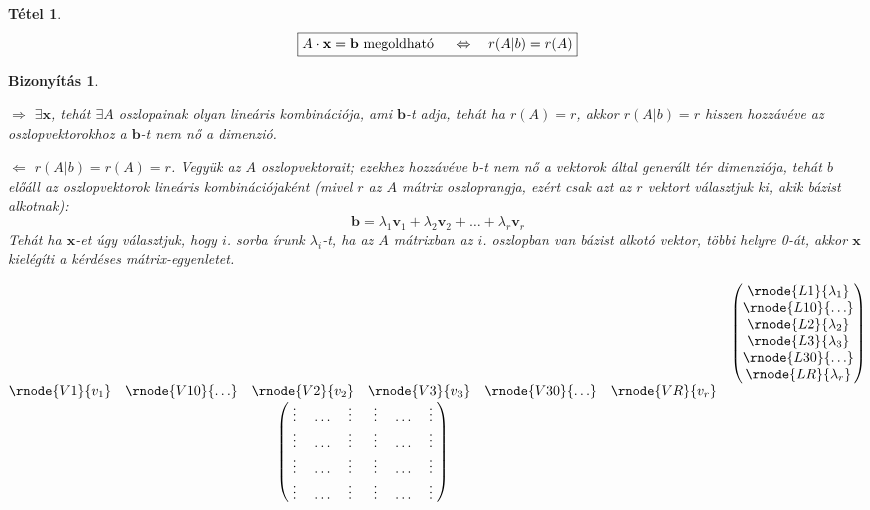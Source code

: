 \documentclass[a4paper,12pt,twoside]{book}
\newcommand{\vek}[1]{\mathbf{#1}} %
\newcommand{\linkomb}[3]{#2_1\vek{#1}_{1} + #2_2\vek{#1}_{2} + \ldots + #2_{#3}\vek{#1}_{#3}}
\newtheorem{tetel}{Tétel}[chapter]
\theoremstyle{break}
\newtheorem{bizNL}[biz]{Bizonyítás}
\begin{document}
\begin{tetel}
 \[\boxed{A\cdot \vek{x} = \vek{b} \hbox{ megoldható } \quad \Leftrightarrow \quad r(A|b) = r(A)}\]
\end{tetel}
\begin{bizNL}
 \begin{description*}
 \item[$\Rightarrow$] $\exists \vek{x}$, tehát $\exists A$ oszlopainak olyan lineáris kombinációja, ami $\vek{b}$-t adja, tehát ha $r(A) = r$, akkor $r(A|b) = r$ hiszen hozzávéve az oszlopvektorokhoz a $\vek{b}$-t nem nő a dimenzió.
 \item[$\Leftarrow$] $r(A|b) = r(A) = r$. Vegyük az $A$ oszlopvektorait; ezekhez hozzávéve $b$-t nem nő a vektorok által generált tér dimenziója, tehát $b$ előáll az oszlopvektorok lineáris kombinációjaként (mivel $r$ az $A$ mátrix oszloprangja, ezért csak azt az $r$ vektort választjuk ki, akik bázist alkotnak):
 \[\vek{b} = \linkomb{v}{\lambda}{r}\]
 Tehát ha $\vek{x}$-et úgy választjuk, hogy $i$. sorba írunk $\lambda_i$-t, ha az $A$ mátrixban az $i$. oszlopban van bázist alkotó vektor, többi helyre 0-át, akkor $\vek{x}$ kielégíti a kérdéses mátrix-egyenletet.
 \end{description*}
 \[\begin{matrix}
   & \begin{pmatrix}
      \rnode{L1}{\lambda_1} \\
      \rnode{L10}{\ldots} \\
      \rnode{L2}{\lambda_2} \\
      \rnode{L3}{\lambda_3} \\
      \rnode{L30}{\ldots} \\
      \rnode{LR}{\lambda_r}
     \end{pmatrix}\\
   \begin{matrix}
    \rnode{V1}{v_1} & \rnode{V10}{\ldots} & \rnode{V2}{v_2} & \rnode{V3}{v_3} & \rnode{V30}{\ldots} & \rnode{VR}{v_r}
   \end{matrix} & \\
   \begin{pmatrix}
    \; \vdots \; & \ldots & \; \vdots \; & \; \vdots \; & \ldots & \; \vdots \; \\
    \vdots & \ldots & \vdots & \vdots & \ldots & \vdots \\
    \vdots & \ldots & \vdots & \vdots & \ldots & \vdots \\
    \vdots & \ldots & \vdots & \vdots & \ldots & \vdots \\

\end{pmatrix}
\end{matrix}\]
\end{bizNL}
\end{document}
